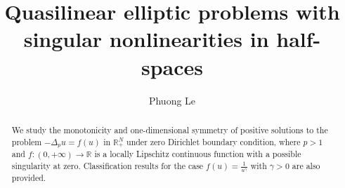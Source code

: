 \documentclass[reqno]{amsart}
\theoremstyle{plain}
\theoremstyle{definition}
\theoremstyle{remark}
\begin{document}
	
	\author{Phuong Le}
	\address{Phuong Le$^{1,2}$ (ORCID: 0000-0003-4724-7118)\newline
		$^1$Faculty of Economic Mathematics, University of Economics and Law, Ho Chi Minh City, Vietnam; \newline
		$^2$Vietnam National University, Ho Chi Minh City, Vietnam}
	
	
	
	\title[Monotonicity and 1D symmetry for $p$-Laplace problems]{Quasilinear elliptic problems with singular nonlinearities in half-spaces}
	\begin{abstract}
		We study the monotonicity and one-dimensional symmetry of positive solutions to the problem $-\Delta_p u = f(u)$ in $\mathbb{R}^N_+$ under zero Dirichlet boundary condition, where $p>1$ and $f:(0,+\infty)\to\mathbb{R}$ is a locally Lipschitz continuous function with a possible singularity at zero. Classification results for the case $f(u)=\frac{1}{u^\gamma}$ with $\gamma>0$ are also provided.
	\end{abstract}
	
	\maketitle
	
\end{document}
